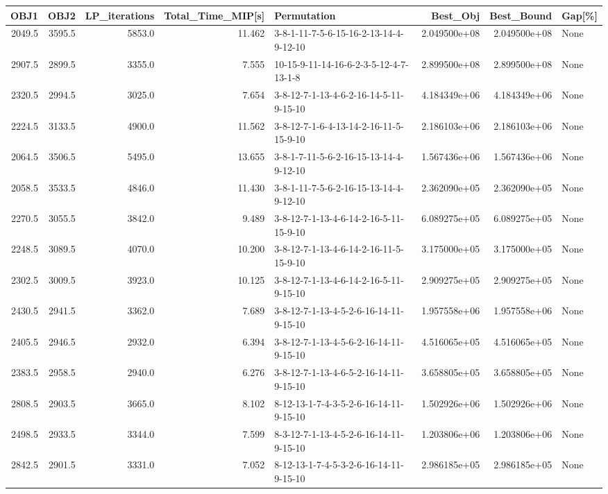 \begin{tabular}{rrrrlrrl}
\toprule
   OBJ1 &    OBJ2 &  LP\_iterations &  Total\_Time\_MIP[s] &                             Permutation &      Best\_Obj &    Best\_Bound & Gap[\%] \\
\midrule
 2049.5 &  3595.5 &         5853.0 &             11.462 &  3-8-1-11-7-5-6-15-16-2-13-14-4-9-12-10 &  2.049500e+08 &  2.049500e+08 &   None \\
 2907.5 &  2899.5 &         3355.0 &              7.555 &  10-15-9-11-14-16-6-2-3-5-12-4-7-13-1-8 &  2.899500e+08 &  2.899500e+08 &   None \\
 2320.5 &  2994.5 &         3025.0 &              7.654 &  3-8-12-7-1-13-4-6-2-16-14-5-11-9-15-10 &  4.184349e+06 &  4.184349e+06 &   None \\
 2224.5 &  3133.5 &         4900.0 &             11.562 &  3-8-12-7-1-6-4-13-14-2-16-11-5-15-9-10 &  2.186103e+06 &  2.186103e+06 &   None \\
 2064.5 &  3506.5 &         5495.0 &             13.655 &  3-8-1-7-11-5-6-2-16-15-13-14-4-9-12-10 &  1.567436e+06 &  1.567436e+06 &   None \\
 2058.5 &  3533.5 &         4846.0 &             11.430 &  3-8-1-11-7-5-6-2-16-15-13-14-4-9-12-10 &  2.362090e+05 &  2.362090e+05 &   None \\
 2270.5 &  3055.5 &         3842.0 &              9.489 &  3-8-12-7-1-13-4-6-14-2-16-5-11-15-9-10 &  6.089275e+05 &  6.089275e+05 &   None \\
 2248.5 &  3089.5 &         4070.0 &             10.200 &  3-8-12-7-1-13-4-6-14-2-16-11-5-15-9-10 &  3.175000e+05 &  3.175000e+05 &   None \\
 2302.5 &  3009.5 &         3923.0 &             10.125 &  3-8-12-7-1-13-4-6-14-2-16-5-11-9-15-10 &  2.909275e+05 &  2.909275e+05 &   None \\
 2430.5 &  2941.5 &         3362.0 &              7.689 &  3-8-12-7-1-13-4-5-2-6-16-14-11-9-15-10 &  1.957558e+06 &  1.957558e+06 &   None \\
 2405.5 &  2946.5 &         2932.0 &              6.394 &  3-8-12-7-1-13-4-5-6-2-16-14-11-9-15-10 &  4.516065e+05 &  4.516065e+05 &   None \\
 2383.5 &  2958.5 &         2940.0 &              6.276 &  3-8-12-7-1-13-4-6-5-2-16-14-11-9-15-10 &  3.658805e+05 &  3.658805e+05 &   None \\
 2808.5 &  2903.5 &         3665.0 &              8.102 &  8-12-13-1-7-4-3-5-2-6-16-14-11-9-15-10 &  1.502926e+06 &  1.502926e+06 &   None \\
 2498.5 &  2933.5 &         3344.0 &              7.599 &  8-3-12-7-1-13-4-5-2-6-16-14-11-9-15-10 &  1.203806e+06 &  1.203806e+06 &   None \\
 2842.5 &  2901.5 &         3331.0 &              7.052 &  8-12-13-1-7-4-5-3-2-6-16-14-11-9-15-10 &  2.986185e+05 &  2.986185e+05 &   None \\
\bottomrule
\end{tabular}
